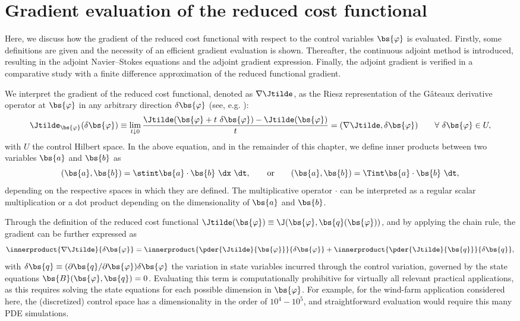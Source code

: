 	
\section{Gradient evaluation of the reduced cost functional}\label{sec:problem_gradient}
	Here, we discuss how the gradient of the reduced cost functional with respect to the control variables $\bs{\varphi}$ is evaluated. Firstly, some definitions are given and the necessity of an efficient gradient evaluation is shown. Thereafter, the continuous adjoint method is introduced, resulting in the adjoint Navier--Stokes equations and the adjoint gradient expression. Finally, the adjoint gradient is verified in a comparative study with a finite difference approximation of the reduced functional gradient. 

	We interpret the gradient of the reduced cost functional, denoted as $\nabla \Jtilde$,  as the Riesz representation of the G\^ateaux derivative operator at $\bs{\varphi}$ in any arbitrary direction $\delta \bs{\varphi}$ (see, e.g. \cite{troltzsch}):
	\begin{equation}
		\Jtilde_{\bs{\varphi}}(\delta \bs{\varphi}) \equiv \lim_{t\downarrow0} \frac{\Jtilde(\bs{\varphi}+t\ \delta \bs{\varphi}) - \Jtilde(\bs{\varphi})}{t} = (\nabla \Jtilde, \delta \bs{\varphi}) \qquad \forall \ \delta \bs{\varphi} \in  U,\label{eq:gateauxder}
	\end{equation}
	with $U$ the control Hilbert space. In the above equation, and in the remainder of this chapter, we define inner products between two variables $\bs{a}$ and $\bs{b}$ as 
	\begin{equation*}
		(\bs{a}, \bs{b}) = \stint \bs{a} \cdot \bs{b}\ \dx\ \dt, \qquad \text{or} \qquad 
		(\bs{a}, \bs{b}) = \Tint \bs{a} \cdot \bs{b}\ \dt,
	\end{equation*}
	depending on the respective spaces in which they are defined. The multiplicative operator $\cdot$ can be interpreted as a regular scalar multiplication or a dot product depending on the dimensionality of $\bs{a}$ and $\bs{b}$.

	Through the definition of the reduced cost functional $\Jtilde(\bs{\varphi}) \equiv \J(\bs{\varphi}, \bs{q}(\bs{\varphi}))$, and by applying the chain rule, the gradient can be further expressed as 
	\begin{equation}
		\innerproduct{\nabla \Jtilde}{\delta \bs{\varphi}} = \innerproduct{\pder{\Jtilde}{\bs{\varphi}}}{\delta \bs{\varphi}} + \innerproduct{\pder{\Jtilde}{\bs{q}}}{\delta \bs{q}},
	\end{equation}
	with $\delta \bs{q} \equiv ( \partial \bs{q}/ \partial \bs{\varphi})\delta \bs{\varphi}$ the variation in state variables incurred through the control variation, governed by the state equations $\bs{B}(\bs{\varphi}, \bs{q}) = 0$. 
	Evaluating this term is computationally prohibitive for virtually all relevant practical applications, as this requires solving the state equations for each possible dimension in $\bs{\varphi}$. For example, for the wind-farm application considered here, the (discretized) control space has a dimensionality in the order of $10^4 - 10^5$, and straightforward evaluation would require this many PDE simulations. 


